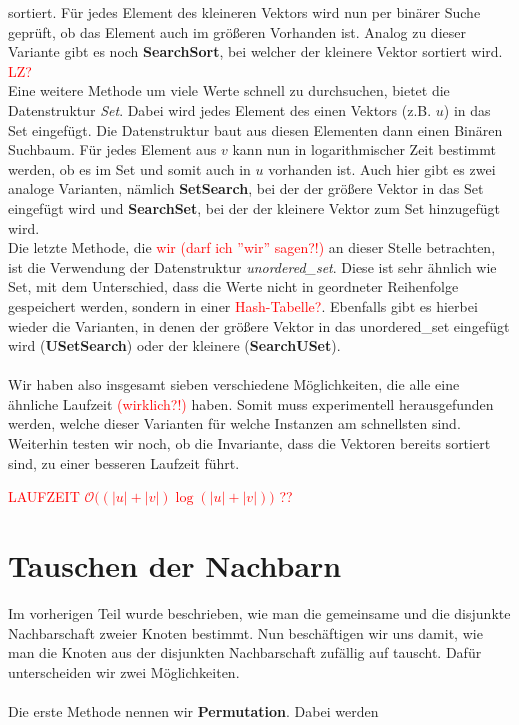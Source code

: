 \documentclass[a4paper]{scrreprt}
\def\O{\mathcal{O}}
\theoremstyle{plain} %
\theoremstyle{definition} %
\begin{document}
sortiert.
Für jedes Element des kleineren Vektors wird nun per binärer Suche geprüft, ob das Element auch im 
größeren Vorhanden ist. Analog zu dieser Variante gibt es noch \textbf{SearchSort}, bei welcher 
der kleinere Vektor sortiert wird. \textcolor{red}{LZ?}
\\
Eine weitere Methode um  viele Werte schnell zu durchsuchen, bietet die Datenstruktur \textit{Set}.
Dabei wird jedes Element des einen Vektors (z.B. $u$) in das Set eingefügt. Die Datenstruktur
baut aus diesen Elementen dann einen Binären Suchbaum. Für jedes Element aus $v$ kann nun in logarithmischer
Zeit bestimmt werden, ob es im Set und somit auch in $u$ vorhanden ist. Auch hier gibt es zwei
analoge Varianten, nämlich \textbf{SetSearch}, bei der der größere Vektor in das Set eingefügt wird
und \textbf{SearchSet}, bei der der kleinere Vektor zum Set hinzugefügt wird.
\\
Die letzte Methode, die \textcolor{red}{wir (darf ich ''wir'' sagen?!)} an dieser Stelle betrachten,
ist die Verwendung der Datenstruktur \textit{unordered\_set}. Diese ist sehr ähnlich wie Set, mit
dem Unterschied, dass die Werte nicht in geordneter Reihenfolge gespeichert werden, sondern
in einer \textcolor{red}{Hash-Tabelle?}. Ebenfalls gibt es hierbei wieder die Varianten, 
in denen der größere Vektor in das unordered\_set eingefügt wird (\textbf{USetSearch}) 
oder der kleinere (\textbf{SearchUSet}).
\\
\\
Wir haben also insgesamt sieben verschiedene Möglichkeiten, die alle eine ähnliche Laufzeit \textcolor{red}{(wirklich?!)}
haben. Somit muss experimentell herausgefunden werden, welche dieser Varianten für welche Instanzen am
schnellsten sind. Weiterhin testen wir noch, ob die Invariante, dass die Vektoren bereits 
sortiert sind, zu einer besseren Laufzeit führt.



\textcolor{red}{LAUFZEIT $\O\Big((|u|+|v|) \log (|u|+|v|)\Big)$ ?? }





\section{Tauschen der Nachbarn}
Im vorherigen Teil wurde beschrieben, wie man die gemeinsame und die disjunkte Nachbarschaft zweier Knoten
bestimmt. Nun beschäftigen wir uns damit, wie man die Knoten aus der disjunkten
Nachbarschaft zufällig auf tauscht. Dafür unterscheiden wir zwei Möglichkeiten.
\\
\\
Die erste Methode nennen wir \textbf{Permutation}. Dabei werden 
\end{document}
